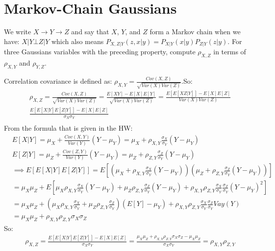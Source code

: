 \documentclass[12pt]{article}
\begin{document}
\section{Markov-Chain Gaussians}
We write $X \rightarrow Y \rightarrow Z$ and say that $X$, $Y$, and $Z$ form a Markov chain when we have: $X|Y \bot Z|Y$ which also means $P_{X,Z|Y}(z,x|y) = P_{X|Y}(x|y)P_{Z|Y}(z|y)$.\;\; For three Gaussians variables with the preceding property, compute $\rho_{X,Z}$ in terms of $\rho_{X,Y}$ and $\rho_{Y,Z}$.
\begin{qsolve}[solution]
    Correlation covariance is defined as: $\rho_{X,Y}=\frac{Cov(X,Z)}{\sqrt{Var(X)Var(Z)}}$\;.So:\\
    \begin{align*}
         & \rho_{X,Z}=\frac{Cov(X,Z)}{\sqrt{Var(X)Var(Z)}} = \frac{E[XY]-E[X]E[Y]}{\sqrt{Var(X)Var(Z)}}=\frac{E[E[XZ|Y]]-E[X]E[Z]}{Var(X)Var(Z)} \\
         & \frac{E[E[X|Y]E[Z|Y]]-E[X]E[Z]}{\sigma_X \sigma_Y}                                                                                    \\
    \end{align*}
    From the formula that is given in the HW:
    \begin{align*}
         & E[X|Y] = \mu_X + \frac{Cov(X,Y)}{Var(Y)}(Y-\mu_Y) = \mu_X + \rho_{X,Y}\frac{\sigma_X}{\sigma_Y}(Y-\mu_Y)                                                                                                    \\
         & E[Z|Y] = \mu_Z + \frac{Cov(Z,Y)}{Var(Y)}(Y-\mu_Y) = \mu_Z + \rho_{Z,Y}\frac{\sigma_Z}{\sigma_Y}(Y-\mu_Y)                                                                                                    \\
         & \implies E[E[X|Y]E[Z|Y]] = E[(\mu_X + \rho_{X,Y}\frac{\sigma_X}{\sigma_Y}(Y-\mu_Y))(\mu_Z + \rho_{Z,Y}\frac{\sigma_Z}{\sigma_Y}(Y-\mu_Y))]                                                                  \\
         & = \mu_X\mu_Z +E[ \mu_X\rho_{X,Y}\frac{\sigma_X}{\sigma_Y}(Y-\mu_Y) + \mu_Z\rho_{Z,Y}\frac{\sigma_Z}{\sigma_Y}(Y-\mu_Y) + \rho_{X,Y}\rho_{Z,Y}\frac{\sigma_X}{\sigma_Y}\frac{\sigma_Z}{\sigma_Y}(Y-\mu_Y)^2] \\
         & = \mu_X\mu_Z + (\mu_X\rho_{X,Y}\frac{\sigma_X}{\sigma_Y}+\mu_Z\rho_{Z,Y}\frac{\sigma_Z}{\sigma_Y})(E[Y]-\mu_Y) + \rho_{X,Y}\rho_{Z,Y}\frac{\sigma_X}{\sigma_Y}\frac{\sigma_Z}{\sigma_Y} Vay(Y)              \\
         & = \mu_X\mu_Z + \rho_{X,Y}\rho_{Z,Y}\sigma_X\sigma_Z
    \end{align*}
    So:
    \begin{align*}
         & \rho_{X,Z} = \frac{E[E[X|Y]E[Z|Y]]-E[X]E[Z]}{\sigma_X \sigma_Y} = \frac{\mu_X\mu_Z + \rho_{X,Y}\rho_{Z,Y}\sigma_X\sigma_Z - \mu_X\mu_Z}{\sigma_X \sigma_Y} = \rho_{X,Y}\rho_{Z,Y} \\
    \end{align*}
\end{qsolve}
\end{document}
